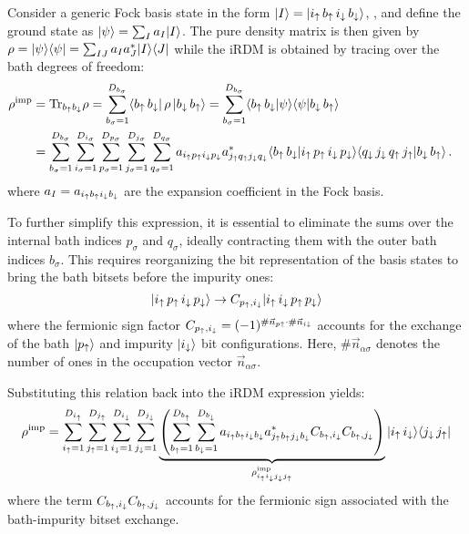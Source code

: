 \documentclass[edipack_sp.tex]{subfiles}
\begin{document}
Consider a generic Fock basis state in the form 
$|I\rangle =|{i}_\uparrow\,{b}_\uparrow\,{i}_\downarrow\,{b}_\downarrow\rangle$, , and define the 
ground state as $|\psi\rangle = \sum_I a_I |I\rangle$. 
The pure density 
matrix is then given by
$\rho = |\psi\rangle\langle \psi| = \sum_{IJ} a_I a^*_J |I\rangle\langle J|$ 
while the iRDM is obtained by tracing over the bath degrees of 
freedom:
\begin{equation}
  \begin{aligned}
    \rho^\mathrm{imp} &= \Tr_{b_\up b_\dw}{\rho} =
    \sum_{b_\sigma=1}^{D_{b_\sigma}}
    \bra{b_\up\, b_\dw}
    \,\rho\,
    \ket{b_\dw\, b_\up} =
    \sum_{b_\sigma=1}^{D_{b_\sigma}}
    \ibra{b_\up\, b_\dw}
    \ket{\psi}\ibra{\psi}
    \ket{b_\dw\, b_\up}    \cr
    &=
    \sum_{b_\sigma=1}^{D_{b_\sigma}}
    \sum_{i_\sigma=1}^{D_{i_\sigma}}
    \sum_{p_\sigma=1}^{D_{p_\sigma}}
    \sum_{j_\sigma=1}^{D_{j_\sigma}} 
    \sum_{q_\sigma=1}^{D_{q_\sigma}}
    a_{i_\up p_\up i_\dw p_\dw} a^*_{j_\up q_\up j_\dw q_\dw}%
    \langle{b_\up\, b_\dw}|{i_\up\, p_\up\, i_\dw\, p_\dw}\rangle
    \langle{q_\dw \,  j_\dw \, q_\up\, j_\up }|{b_\dw\, b_\up}\rangle\, .
  \end{aligned}
\end{equation}
where $a_I = a_{i_\uparrow b_\uparrow i_\downarrow b_\downarrow}$ are the expansion
coefficient in the Fock basis.

To further simplify this expression, it is essential to eliminate the 
sums over the internal bath indices $p_\sigma$ and $q_\sigma$, ideally 
contracting them with the outer bath indices $b_\sigma$. This requires 
reorganizing the bit representation of the basis states to bring the 
bath bitsets before the impurity ones:
$$
|i_\uparrow\, p_\uparrow\, i_\downarrow\, p_\downarrow\rangle \rightarrow C_{p_\uparrow,i_\downarrow} |i_\uparrow\, i_\downarrow \,p_\uparrow\,p_\downarrow\rangle
$$
where the fermionic sign factor
$C_{p_\uparrow,i_\downarrow}  = (-1)^{\#\vec{n}_{p\uparrow} \cdot
  \#\vec{n}_{i\downarrow}}$
accounts for the exchange of the bath $|p_\uparrow\rangle$  and impurity
$|i_\downarrow\rangle$ bit configurations.
Here, $\#\vec{n}_{\alpha\sigma}$ denotes the number of ones in the 
occupation vector $\vec{n}_{\alpha\sigma}$. 

Substituting this relation back into the iRDM expression yields:
\begin{equation}
    \rho^\mathrm{imp} =
    \sum_{i_\uparrow=1}^{D_{i_\uparrow}}
    \sum_{j_\uparrow=1}^{D_{j_\uparrow}}
    \sum_{i_\downarrow=1}^{D_{i_\downarrow}}
    \sum_{j_\downarrow=1}^{D_{j_\downarrow}}
    \underbrace{\left(
    \sum_{b_\uparrow=1}^{D_{b_\uparrow}}
    \sum_{b_\downarrow=1}^{D_{b_\downarrow}}
    a_{i_\uparrow b_\uparrow i_\downarrow b_\downarrow} a^*_{j_\uparrow b_\uparrow j_\downarrow b_\downarrow}
    C_{b_\uparrow,i_\downarrow}C_{b_\uparrow,j_\downarrow}\right)}_{
    \rho^\mathrm{imp}_{i_\uparrow i_\downarrow j_\downarrow j_\uparrow}}
    |i_\uparrow\, i_\downarrow\rangle\langle j_\downarrow \, j_\uparrow|
  \end{equation}
where the term 
$C_{b_\uparrow,i_\downarrow}C_{b_\uparrow,j_\downarrow}$ accounts for the fermionic 
sign associated with the bath-impurity bitset exchange.
\end{document}
